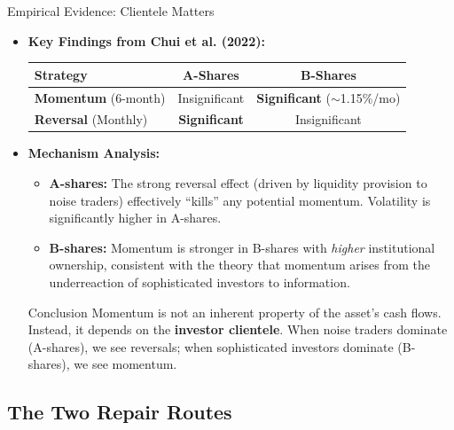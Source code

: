 \documentclass{beamer}
\begin{document}
\begin{frame}{Empirical Evidence: Clientele Matters}
	\begin{itemize}
		\item \textbf{Key Findings from Chui et al. (2022):}
		\begin{table}[h]
			\centering
			\small
			\begin{tabular}{lcc}
				\hline
				\textbf{Strategy} & \textbf{A-Shares} & \textbf{B-Shares} \\
				\hline
				\textbf{Momentum} (6-month) & Insignificant & \textbf{Significant} ($\sim$1.15\%/mo) \\
				\textbf{Reversal} (Monthly) & \textbf{Significant} & Insignificant \\
				\hline
			\end{tabular}
		\end{table}
		
		\item \textbf{Mechanism Analysis:}
		\begin{itemize}
			\item \textbf{A-shares:} The strong reversal effect (driven by liquidity provision to noise traders) effectively ``kills'' any potential momentum. Volatility is significantly higher in A-shares.
			\item \textbf{B-shares:} Momentum is stronger in B-shares with \textit{higher} institutional ownership, consistent with the theory that momentum arises from the underreaction of sophisticated investors to information.
		\end{itemize}
		
		\begin{block}{Conclusion}
			Momentum is not an inherent property of the asset's cash flows. Instead, it depends on the \textbf{investor clientele}. When noise traders dominate (A-shares), we see reversals; when sophisticated investors dominate (B-shares), we see momentum.
		\end{block}
	\end{itemize}
\end{frame}

\subsection{The Two Repair Routes}
\end{document}
